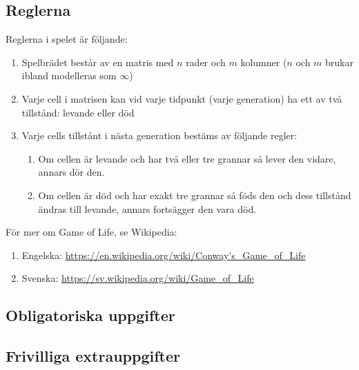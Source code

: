 \subsection{Reglerna}

Reglerna i spelet är följande:

\begin{enumerate}
    \item Spelbrädet består av en matris med $n$ rader och $m$ kolumner ($n$ och $m$ brukar ibland modelleras som $\infty$)
    \item Varje cell i matrisen kan vid varje tidpunkt (varje generation) ha ett av två tillstånd: levande eller död
    \item Varje cells tillstånt i nästa generation bestäms av följande regler:
        \begin{enumerate}
            \item Om cellen är levande och har två eller tre grannar så lever den vidare, annars dör den.
            \item Om cellen är död och har exakt tre grannar så föds den och dess tillstånd ändras till levande, annars fortsägger den vara död.
        \end{enumerate}
\end{enumerate}


För mer om Game of Life, se Wikipedia:

\begin{enumerate}
    \item Engelska: \url{https://en.wikipedia.org/wiki/Conway's_Game_of_Life}
    \item Svenska: \url{https://sv.wikipedia.org/wiki/Game_of_Life}
\end{enumerate}


\subsection{Obligatoriska uppgifter}









\subsection{Frivilliga extrauppgifter}

